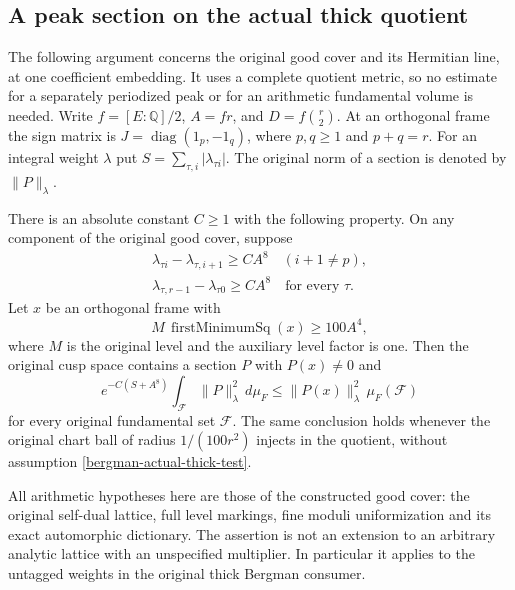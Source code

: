 \subsection{A peak section on the actual thick quotient}
\label{shared-bergman-actual-thick}

The following argument concerns the original good cover and its
Hermitian line, at one coefficient embedding.  It uses a complete
quotient metric, so no estimate for a separately periodized peak or for
an arithmetic fundamental volume is needed.  Write
$f=[E:\mathbb Q]/2$, $A=fr$, and $D=f\binom r2$.
At an orthogonal frame the sign matrix is
$J=\operatorname{diag}(1_p,-1_q)$, where $p,q\geq1$ and $p+q=r$.
For an integral weight $\lambda$ put
$S=\sum_{\tau,i}|\lambda_{\tau i}|$.
The original norm of a section is denoted by $\|P\|_\lambda$.

\begin{theorem}
\label{bergman-actual-thick-peak}
There is an absolute constant $C\geq1$ with the following property.
On any component of the original good cover, suppose
\[
 \begin{gathered}
 \lambda_{\tau i}-\lambda_{\tau,i+1}\geq CA^8
       \quad(i+1\ne p),\\
 \lambda_{\tau,r-1}-\lambda_{\tau0}\geq CA^8
       \quad\text{for every }\tau.
 \end{gathered}
\]
Let $x$ be an orthogonal frame with
\begin{equation}
 \label{bergman-actual-thick-test}
  M\,\operatorname{firstMinimumSq}(x)\geq100A^4,
\end{equation}
where $M$ is the original level and the auxiliary level factor is one.
Then the original cusp space contains a section $P$ with $P(x)\ne0$ and
\begin{equation}
 \label{bergman-actual-thick-peak-bound}
 e^{-C(S+A^8)}\int_{\mathcal F}\|P\|_\lambda^2\,d\mu_F
 \leq \|P(x)\|_\lambda^2\,\mu_F(\mathcal F)
\end{equation}
for every original fundamental set $\mathcal F$.
The same conclusion holds whenever the original chart ball of radius
$1/(100r^2)$ injects in the quotient, without assumption
\eqref{bergman-actual-thick-test}.
\end{theorem}

All arithmetic hypotheses here are those of the constructed good cover:
the original self-dual lattice, full level markings, fine moduli
uniformization and its exact automorphic dictionary.  The assertion is
not an extension to an arbitrary analytic lattice with an unspecified
multiplier.  In particular it applies to the untagged weights in the
original thick Bergman consumer.\cite{bergman-thick-source}

